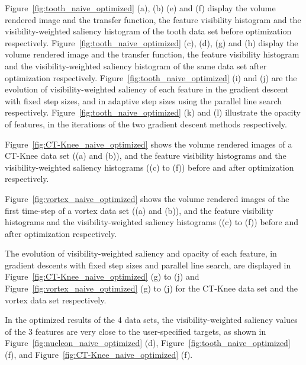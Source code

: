 Figure~\ref{fig:tooth_naive_optimized} (a), (b) (e) and (f) display the volume rendered image and the transfer function, the feature visibility histogram and the visibility-weighted saliency histogram of the tooth data set before optimization respectively.
Figure~\ref{fig:tooth_naive_optimized} (c), (d), (g) and (h) display the volume rendered image and the transfer function, the feature visibility histogram and the visibility-weighted saliency histogram of the same data set after optimization respectively.
Figure~\ref{fig:tooth_naive_optimized} (i) and (j) are the evolution of visibility-weighted saliency of each feature in the gradient descent with fixed step sizes, and in adaptive step sizes using the parallel line search respectively. Figure~\ref{fig:tooth_naive_optimized} (k) and (l) illustrate the opacity of features, in the iterations of the two gradient descent methods respectively.

Figure~\ref{fig:CT-Knee_naive_optimized} shows the volume rendered images of a CT-Knee data set ((a) and (b)), and the feature visibility histograms and the visibility-weighted saliency histograms ((c) to (f)) before and after optimization respectively.

Figure~\ref{fig:vortex_naive_optimized} shows the volume rendered images of the first time-step of a vortex data set ((a) and (b)), and the feature visibility histograms and the visibility-weighted saliency histograms ((c) to (f)) before and after optimization respectively.

The evolution of visibility-weighted saliency and opacity of each feature, in gradient descents with fixed step sizes and parallel line search, are displayed in Figure~\ref{fig:CT-Knee_naive_optimized} (g) to (j) and Figure~\ref{fig:vortex_naive_optimized} (g) to (j) for the CT-Knee data set and the vortex data set respectively.

In the optimized results of the 4 data sets, the visibility-weighted saliency values of the 3 features are very close to the user-specified targets, as shown in Figure~\ref{fig:nucleon_naive_optimized} (d), Figure~\ref{fig:tooth_naive_optimized} (f), and Figure~\ref{fig:CT-Knee_naive_optimized} (f).


